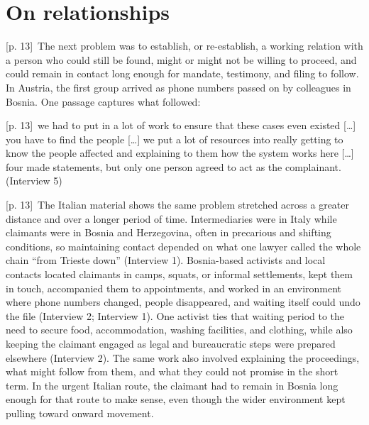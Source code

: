 \documentclass[10pt,a4paper]{article}
\begin{document}
\section*{On relationships}
{\scriptsize\color{gray} [p. 13]}\ The next problem was to establish, or re-establish, a working relation with a person who could still be found, might or might not be willing to proceed, and could remain in contact long enough for mandate, testimony, and filing to follow. In Austria, the first group arrived as phone numbers passed on by colleagues in Bosnia. One passage captures what followed:\par
{\scriptsize\color{gray} [p. 13]}\ we had to put in a lot of work to ensure that these cases even existed […] you have to find the people […] we put a lot of resources into really getting to know the people affected and explaining to them how the system works here […] four made statements, but only one person agreed to act as the complainant. (Interview 5)\par
{\scriptsize\color{gray} [p. 13]}\ The Italian material shows the same problem stretched across a greater distance and over a longer period of time. Intermediaries were in Italy while claimants were in Bosnia and Herzegovina, often in precarious and shifting conditions, so maintaining contact depended on what one lawyer called the whole chain “from Trieste down” (Interview 1). Bosnia-based activists and local contacts located claimants in camps, squats, or informal settlements, kept them in touch, accompanied them to appointments, and worked in an environment where phone numbers changed, people disappeared, and waiting itself could undo the file (Interview 2; Interview 1). One activist ties that waiting period to the need to secure food, accommodation, washing facilities, and clothing, while also keeping the claimant engaged as legal and bureaucratic steps were prepared elsewhere (Interview 2). The same work also involved explaining the proceedings, what might follow from them, and what they could not promise in the short term. In the urgent Italian route, the claimant had to remain in Bosnia long enough for that route to make sense, even though the wider environment kept pulling toward onward movement.\par
\end{document}
